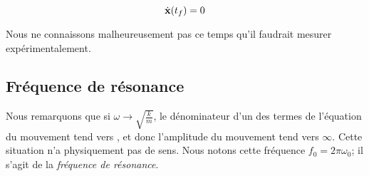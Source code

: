 $$\dot{\bf x}(t_f) = 0$$

Nous ne connaissons malheureusement pas ce temps qu'il faudrait mesurer expérimentalement.

\subsection{Fréquence de résonance}
Nous remarquons que si $\omega \rightarrow \sqrt{\frac{k}{m}}$, le dénominateur d'un des termes de l'équation du mouvement
tend vers , et donc l'amplitude du mouvement tend vers $\infty$. Cette situation n'a physiquement
pas de sens. Nous notons cette fréquence $f_0 =  2\pi\omega_0$; il s'agit de la \textit{fréquence de résonance}.



